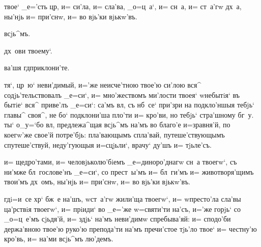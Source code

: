 
 твое` _е='сть цр, и= си'ла, и= сла'ва, 
_о=ц~а`, и= сн~а, и= ст~а'гw дх~а, ны'нjь и= при'снw, и= 
во вjь'ки вjькw'въ.


  всjь^мъ.

 дх~ови твоему`.

  ва'шя гд приклони'те.



 тя`, цр~ю` неви'димый, и='же неисче'тною 
твое'ю си'лою вся^ содjь'тельствовалъ _е=си`, и= 
мно'жествомъ ми'лости твоея` w\т небытiя` въ бытiе` вся^ 
приве'лъ _е=си`: са'мъ вл, съ нб~се` при'зри на 
подкло'ншыя тебjь` главы^ своя^, не бо` подклони'ша 
пло'ти и= кро'ви, но тебjь` стра'шному бг~у. ты` о_у=`бо 
вл, предлежа^щая всjь^мъ на'мъ во благо'е и=зравня'й, 
по коегw'же свое'й потре'бjь: пла'вающымъ спла'вай, 
путеше'ствующымъ спутеше'ствуй, неду'гующыя и=сцjьли`, 
врачу` ду'шъ и= тjьле'съ.


 и= щедро'тами, и= человjьколю'бiемъ 
_е=диноро'днагw сн~а твоегw`, съ ни'мже бл~гослове'нъ 
_е=си`, со прест~ы'мъ и= бл~ги'мъ и= животворя'щимъ 
твои'мъ дх~омъ, ны'нjь и= при'снw, и= во вjь'ки вjькw'въ.



 гд i=и~се хр` бж~е на'шъ, w\т ст~а'гw 
жили'ща твоегw`, и= w\т престо'ла сла'вы ца'рствiя 
твоегw`, и= прiиди` во _е='же w=святи'ти на'съ, и='же 
горjь` со _о=ц~е'мъ сjьдя'й, и= здjь` на'мъ неви'димw 
спребыва'яй: и= сподо'би держа'вною твое'ю руко'ю 
препода'ти на'мъ пречи'стое тjь'ло твое` и= честну'ю 
кро'вь, и= на'ми всjь^мъ лю'демъ.


